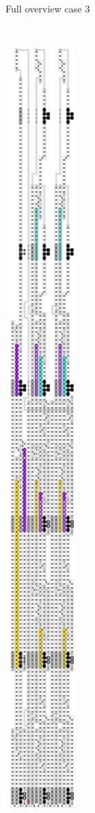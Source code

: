 \begin{figure}[H]
\begin{subfigure}[t]{0.3\textwidth}
            \caption{\label{fig:full_overview_case3_colored} Full overview case 3}
        \end{subfigure}%
        ~
        \begin{subfigure}[t]{0.3\textwidth}
            \centering
            \includegraphics[width=0.3\textwidth]{full_overview_case2_colored}

\end{subfigure}
\end{figure}
